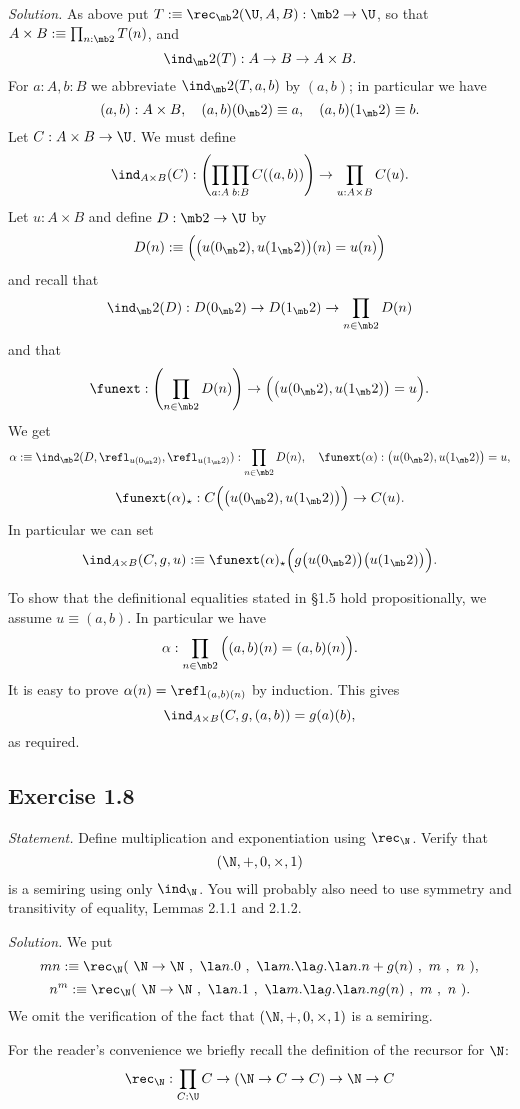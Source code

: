 \documentclass[12pt]{article}
\begin{document}
\nn\emph{Solution.} As above put $T:\equiv\rec_\mb2(\U,A,B):\mb2\to\U$, so that $A\times B:\equiv\prod_{n:\mb2}T(n)$, and 
$$
\ind_\mb2(T):A\to B\to A\times B.
$$ 
For $a:A,b:B$ we abbreviate $\ind_\mb2(T,a,b)$ by $(a,b)$; in particular we have 
$$
(a,b):A\times B,\quad(a,b)(0_\mb2)\equiv a,\quad(a,b)(1_\mb2)\equiv b.
$$ 
Let $C:A\times B\to\U$. We must define 
$$
\ind_{A\times B}(C):\left(\prod_{a:A}\prod_{b:B}C((a,b))\right)\to\prod_{u:A\times B}C(u).
$$ 
Let $u:A\times B$ and define $D:\mb2\to\U$ by 
$$
D(n):\equiv\Big(\big(u(0_\mb2),u(1_\mb2)\big)(n)=u(n)\Big)
$$ 
and recall that 
$$
\ind_\mb2(D):D(0_\mb2)\to D(1_\mb2)\to\prod_{n\in\mb2}D(n)
$$ 
and that 
$$
\funext:\left(\prod_{n\in\mb2}D(n)\right)\to\Big(\big(u(0_\mb2),u(1_\mb2)\big)=u\Big).
$$
We get 
$$
\alpha:\equiv\ind_\mb2(D,\refl_{u(0_\mb2)},\refl_{u(1_\mb2)}):\prod_{n\in\mb2}D(n),\quad\funext(\alpha):\big(u(0_\mb2),u(1_\mb2)\big)=u,
$$
$$
\funext(\alpha)_\star:C\Big(\big(u(0_\mb2),u(1_\mb2)\big)\Big)\to C(u).
$$
In particular we can set
$$
\ind_{A\times B}(C,g,u):\equiv\funext(\alpha)_\star\Big(g\big(u(0_\mb2)\big)\big(u(1_\mb2)\big)\Big).
$$

To show that the definitional equalities stated in \S1.5 hold propositionally, we assume $u\equiv(a,b)$. In particular we have 
$$
\alpha:\prod_{n\in\mb2}\Big((a,b)(n)=(a,b)(n)\Big).
$$ 
It is easy to prove $\alpha(n)=\refl_{(a,b)(n)}$ by induction. This gives 
$$
\ind_{A\times B}(C,g,(a,b))=g(a)(b),
$$ 
as required.


\subsection{Exercise 1.8}

\emph{Statement.} Define multiplication and exponentiation using $\rec_\N$. Verify that $$(\N,+,0,\times,1)$$ is a semiring using only $\ind_\N$. You will probably also need to use symmetry and transitivity of equality, Lemmas 2.1.1 and 2.1.2.

\nn\emph{Solution.} We put 
$$
mn:\equiv\rec_\N(\ \N\to\N\ ,\ \la n.0\ ,\ \la m.\la g.\la n.n+g(n)\ ,\ m\ ,\ n\ ),
$$
$$
n^m:\equiv\rec_\N(\ \N\to\N\ ,\ \la n.1\ ,\ \la m.\la g.\la n.ng(n)\ ,\ m\ ,\ n\ ).
$$ 
We omit the verification of the fact that $(\N,+,0,\times,1)$ is a semiring.

For the reader's convenience we briefly recall the definition of the recursor for $\N$:
$$\rec_\N:\prod_{C:\U}C\to(\N\to C\to C)\to\N\to C$$
\end{document}
